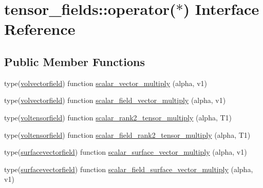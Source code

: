 \hypertarget{interfacetensor__fields_1_1operator_07_5_08}{\section{tensor\-\_\-fields\-:\-:operator($\ast$) Interface Reference}
\label{interfacetensor__fields_1_1operator_07_5_08}
}
\subsection*{Public Member Functions}
\begin{DoxyCompactItemize}
\item 
type(\hyperlink{structtensor__fields_1_1volvectorfield}{volvectorfield}) function \hyperlink{interfacetensor__fields_1_1operator_07_5_08_a6ed87260fa641e83275fceb9bc78a538}{scalar\-\_\-vector\-\_\-multiply} (alpha, v1)
\item 
type(\hyperlink{structtensor__fields_1_1volvectorfield}{volvectorfield}) function \hyperlink{interfacetensor__fields_1_1operator_07_5_08_a782eed0d4af5975e51dfaf824a39a29d}{scalar\-\_\-field\-\_\-vector\-\_\-multiply} (alpha, v1)
\item 
type(\hyperlink{structtensor__fields_1_1voltensorfield}{voltensorfield}) function \hyperlink{interfacetensor__fields_1_1operator_07_5_08_a3b6f9860834d05a397b96046c50aa32c}{scalar\-\_\-rank2\-\_\-tensor\-\_\-multiply} (alpha, T1)
\item 
type(\hyperlink{structtensor__fields_1_1voltensorfield}{voltensorfield}) function \hyperlink{interfacetensor__fields_1_1operator_07_5_08_aab41a7ee229630cc9b8271451682bcb3}{scalar\-\_\-field\-\_\-rank2\-\_\-tensor\-\_\-multiply} (alpha, T1)
\item 
type(\hyperlink{structtensor__fields_1_1surfacevectorfield}{surfacevectorfield}) function \hyperlink{interfacetensor__fields_1_1operator_07_5_08_a6620b9a71f05ff4be9b13c60eee023d1}{scalar\-\_\-surface\-\_\-vector\-\_\-multiply} (alpha, v1)
\item 
type(\hyperlink{structtensor__fields_1_1surfacevectorfield}{surfacevectorfield}) function \hyperlink{interfacetensor__fields_1_1operator_07_5_08_a5dc351b77e0065d51ddefed50e72a3ca}{scalar\-\_\-field\-\_\-surface\-\_\-vector\-\_\-multiply} (alpha, v1)
\end{DoxyCompactItemize}


